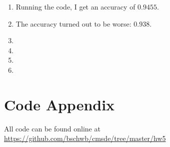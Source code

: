 \documentclass[a4paper,11pt]{scrartcl}
\begin{document}
\begin{enumerate}

\item
  Running the code, I get an accuracy of $0.9455$.

\item
  The accuracy turned out to be worse: $0.938$.

\item

\item

\item

\item


\end{enumerate}
 
\section*{Code Appendix}

All code can be found online at
\url{https://github.com/bschwb/cmsde/tree/master/hw5}

% 

% 
\end{document}
